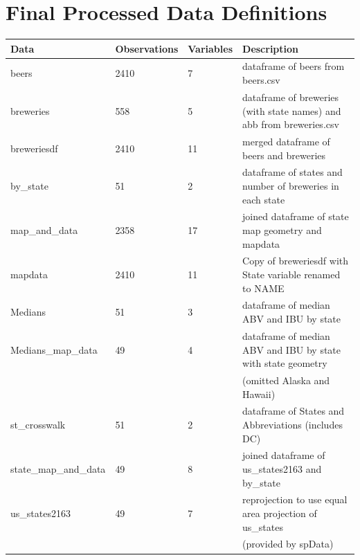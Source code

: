 \documentclass{report}
\begin{document}
\section{Final Processed Data Definitions}
\label{sec:Defs}
\begin{tabular}{l l l l}
Data & Observations & Variables & Description\\
\hline
\hline
beers & 2410 & 7 & dataframe of beers from beers.csv\\
\hline
breweries & 558 & 5 & dataframe of breweries (with state names) and abb from breweries.csv\\
\hline
breweriesdf & 2410 & 11 & merged dataframe of beers and breweries\\
\hline
by_state & 51 & 2 & dataframe of states and number of breweries in each state\\
\hline
map_and_data & 2358 & 17 & joined dataframe of state map geometry and mapdata\\
\hline
mapdata & 2410 & 11 & Copy of breweriesdf with State variable renamed to NAME\\
\hline
Medians & 51 & 3 & dataframe of median ABV and IBU by state\\
\hline
Medians_map_data & 49 & 4 & dataframe of median ABV and IBU by state with state geometry \\
&&&(omitted Alaska and Hawaii)\\
\hline
st_crosswalk & 51 & 2 & dataframe of States and Abbreviations (includes DC)\\
\hline
state_map_and_data & 49 & 8 & joined dataframe of us_states2163 and by_state\\
\hline
us_states2163 & 49 & 7 & reprojection to use equal area projection of us_states\\ 
&&& (provided by spData)\\
\hline
\end{tabular}
\end{document}
